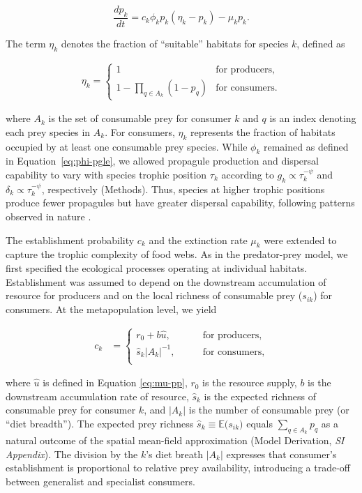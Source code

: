\documentclass[11pt, class=article, crop=false]{standalone}
\theoremstyle{definition}
\begin{document}
\begin{equation}
    \frac{dp_k}{dt} = c_{k} \phi_k p_k (\eta_k - p_k) - \mu_k p_k.
    \label{eq:model-fw}
\end{equation}

The term $\eta_k$ denotes the fraction of ``suitable'' habitats for species $k$, defined as

\begin{align}
    \eta_k 
    = 
    \begin{cases}
        1 &\text{for producers},\\
        1 - \prod_{q \in A_k}(1-p_q) &\text{for consumers.}
    \end{cases}
    \label{eq:eta}
\end{align}

where $A_k$ is the set of consumable prey for consumer $k$ and $q$ is an index denoting each prey species in $A_k$.
For consumers, $\eta_k$ represents the fraction of habitats occupied by at least one consumable prey species. 
While $\phi_k$ remained as defined in Equation~\ref{eq:phi-pgle}, we allowed propagule production and dispersal capability to vary with species trophic position $\tau_k$ according to $g_k \propto \tau_k^{-\psi}$ and $\delta_k \propto \tau_k^{-\psi}$, respectively (Methods). 
Thus, species at higher trophic positions produce fewer propagules but have greater dispersal capability, following patterns observed in nature \cite{finlay_stream_2011, mccann_dynamics_2005}.

The establishment probability $c_k$ and the extinction rate $\mu_k$ were extended to capture the trophic complexity of food webs.
As in the predator-prey model, we first specified the ecological processes operating at individual habitats.
Establishment was assumed to depend on the downstream accumulation of resource for producers and on the local richness of consumable prey ($s_{ik}$) for consumers.
At the metapopulation level, we yield

\begin{align}
    c_k 
    &=
    \begin{cases}
        r_0 + b \hat{u}, \qquad &\text{for producers},\\
        \hat{s}_k |A_k|^{-1}, \qquad &\text{for consumers},\\
    \end{cases}
    \label{eq:estb-prob}
\end{align}

where $\hat{u}$ is defined in Equation \ref{eq:mu-pp}, $r_0$ is the resource supply, $b$ is the downstream accumulation rate of resource, $\hat{s}_k$ is the expected richness of consumable prey for consumer $k$, and $|A_k|$ is the number of consumable prey (or ``diet breadth'').
The expected prey richness $\hat{s}_k \equiv \mathbb{E}\bigl(s_{ik}\bigr)$ equals $\sum_{q \in A_k} p_q$ as a natural outcome of the spatial mean-field approximation (Model Derivation, \textit{SI Appendix}).
The division by the $k$'s diet breath $|A_k|$ expresses that consumer's establishment is proportional to relative prey availability, introducing a trade-off between generalist and specialist consumers.
\end{document}
